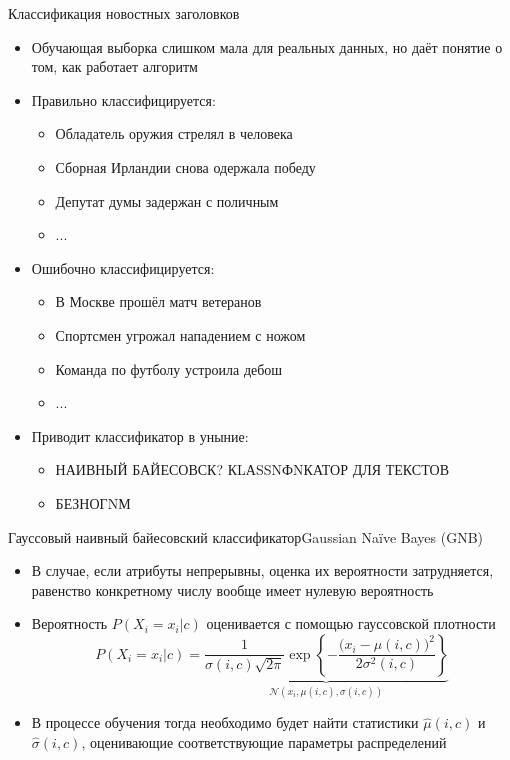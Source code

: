\documentclass[compress,red,unicode]{beamer}
\begin{document}
\begin{frame}{Классификация новостных заголовков}
\begin{itemize}
\item Обучающая выборка слишком мала для реальных данных, но даёт понятие о том, как работает алгоритм

\item Правильно классифицируется:
\begin{itemize}
\item Обладатель оружия стрелял в человека
\item Сборная Ирландии снова одержала победу
\item Депутат думы задержан с поличным
\item ...
\end{itemize}



\item Ошибочно классифицируется:
\begin{itemize}
\item В Москве прошёл матч ветеранов
\item Спортсмен угрожал нападением с ножом
\item Команда по футболу устроила дебош
\item ...
\end{itemize}
\item Приводит классификатор в уныние:
\begin{itemize}
\item НАИВНЫЙ БАЙЕСОВСК? КLАSSNФNКАТОР ДЛЯ ТЕКСТОВ
\item БЕЗНОГNМ
\end{itemize}

\end{itemize}
\end{frame}

\begin{frame}{Гауссовый наивный байесовский классификатор}{Gaussian Naïve Bayes (GNB)}
\begin{itemize}
	\item В случае, если атрибуты непрерывны, оценка их вероятности затрудняется, равенство конкретному числу вообще имеет нулевую вероятность
	\item Вероятность $P(X_i = x_i | c)$ оценивается с помощью гауссовской плотности %
$$
P(X_i = x_i | c) = \underbrace{\frac{1}{\sigma(i,c) \sqrt{2 \pi}} \exp \left\{ - \frac{\bigl(x_i-\mu(i,c)\bigr)^2}{2 \sigma^2 (i,c)} \right\}}_{\mathcal{N} (x_i, \mu(i,c),\sigma(i,c))}
$$
	\item В процессе обучения тогда необходимо будет найти статистики $\hat \mu (i,c)$ и $\hat \sigma (i,c)$, оценивающие соответствующие параметры распределений

\end{itemize}
\end{frame}
\end{document}
